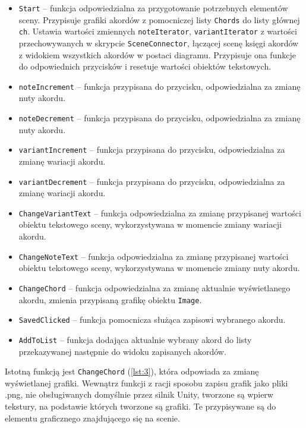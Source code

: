 \begin{itemize}
    \item \texttt{Start} -- funkcja odpowiedzialna za przygotowanie potrzebnych elementów sceny. Przypisuje grafiki akordów z pomocniczej listy \texttt{Chords} do listy głównej \texttt{ch}. Ustawia wartości zmiennych \texttt{noteIterator}, \texttt{variantIterator} z wartości przechowywanych w skrypcie \texttt{SceneConnector}, łączącej scenę księgi akordów z widokiem wszystkich akordów w postaci diagramu. Przypisuje ona funkcje do odpowiednich przycisków i resetuje wartości obiektów tekstowych.
    \item \texttt{noteIncrement} -- funkcja przypisana do przycisku, odpowiedzialna za zmianę nuty akordu.
    \item \texttt{noteDecrement} -- funkcja przypisana do przycisku, odpowiedzialna za zmianę nuty akordu.
    \item \texttt{variantIncrement} -- funkcja przypisana do przycisku, odpowiedzialna za zmianę wariacji akordu.
    \item \texttt{variantDecrement} -- funkcja przypisana do przycisku, odpowiedzialna za zmianę wariacji akordu.
    \item \texttt{ChangeVariantText} -- funkcja odpowiedzialna za zmianę przypisanej wartości obiektu tekstowego sceny, wykorzystywana w momencie zmiany wariacji akordu.
    \item \texttt{ChangeNoteText} -- funkcja odpowiedzialna za zmianę przypisanej wartości obiektu tekstowego sceny, wykorzystywana w momencie zmiany nuty akordu.
    \item \texttt{ChangeChord} -- funkcja odpowiedzialna za zmianę aktualnie wyświetlanego akordu, zmienia przypisaną grafikę obiektu \texttt{Image}.
    \item \texttt{SavedClicked} -- funkcja pomocnicza służąca zapisowi wybranego akordu.
    \item \texttt{AddToList} -- funkcja dodająca aktualnie wybrany akord do listy przekazywanej następnie do widoku zapisanych akordów.
\end{itemize}

Istotną funkcją jest \texttt{ChangeChord} (\ref{lst:3}), która odpowiada za zmianę wyświetlanej grafiki. Wewnątrz funkcji z racji sposobu zapisu grafik jako pliki .png, nie obsługiwanych domyślnie przez silnik Unity, tworzone są wpierw tekstury, na podstawie których tworzone są grafiki. Te przypisywane są do elementu graficznego znajdującego się na scenie.

